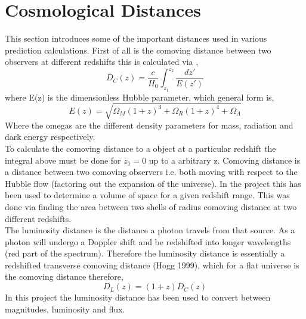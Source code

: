\documentclass{article}
\begin{document}

\section{Cosmological Distances}
This section introduces some of the important distances used in various prediction calculations. First of all is the comoving distance between two observers at different redshifts this is calculated via \cite{distance_measures_cosmology},
\begin{equation}
D_{C}(z)=\frac{c}{H_{0}}\int^{z_{2}}_{z_{1}}\frac{dz'}{E(z')}
\end{equation}
where E(z) is the dimensionless Hubble parameter, which general form is,
\begin{equation}
E(z)=\sqrt{\Omega_{M}(1+z)^{3}+\Omega_{R}(1+z)^{4}+\Omega_{\Lambda}}
\end{equation}
\indent Where the omegas are the different density parameters for mass, radiation and dark energy respectively.\\
\indent To calculate the comoving distance to a object at a particular redshift the integral above must be done for $z_{1}=0$ up to a arbitrary z. Comoving distance is a distance between two comoving observers i.e. both moving with respect to the Hubble flow (factoring out the expansion of the universe). In the project this has been used to determine a volume of space for a given redshift range. This was done via finding the area between two shells of radius comoving distance at two different redshifts.\\

\indent The luminosity distance is the distance a photon travels from that source. As a photon will undergo a Doppler shift and be redshifted into longer wavelengths (red part of the spectrum). Therefore the luminosity distance is essentially a redshifted transverse comoving distance (Hogg 1999), which for a flat universe is the comoving distance therefore,
\begin{equation}
D_{L}(z)=(1+z)D_{C}(z)
\end{equation}
In this project the luminosity distance has been used to convert between magnitudes, luminosity and flux.\\
\end{document}
